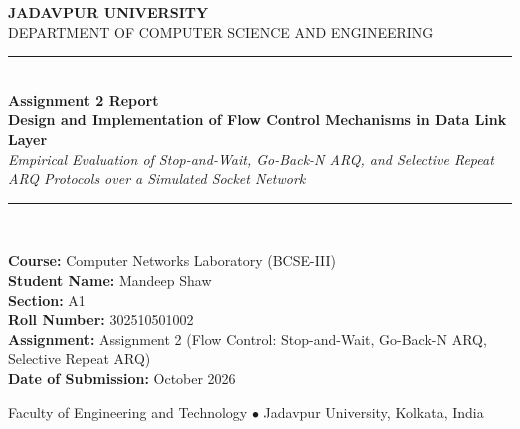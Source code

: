 \documentclass[11pt,a4paper]{article}
\begin{document}
\hypersetup{pageanchor=false}
\begin{titlepage}
    \centering
    \vspace*{1.5cm}
    
    {\Large \textbf{JADAVPUR UNIVERSITY}}\\[0.3cm]
    {\large DEPARTMENT OF COMPUTER SCIENCE AND ENGINEERING}\\[2.0cm]
    
    \rule{\linewidth}{1.2pt}\\[0.4cm]
    {\huge \textbf{Assignment 2 Report}}\\[0.3cm]
    {\LARGE \textbf{Design and Implementation of Flow Control Mechanisms in Data Link Layer}}\\[0.3cm]
    {\large \textit{Empirical Evaluation of Stop-and-Wait, Go-Back-N ARQ, and Selective Repeat ARQ Protocols over a Simulated Socket Network}}\\[0.4cm]
    \rule{\linewidth}{1.2pt}\\[2.2cm]
    
    \begin{flushleft}
        \large
        \textbf{Course:} Computer Networks Laboratory (BCSE-III)\\[0.2cm]
        \textbf{Student Name:} Mandeep Shaw\\[0.2cm]
        \textbf{Section:} A1\\[0.2cm]
        \textbf{Roll Number:} 302510501002\\[0.2cm]
        \textbf{Assignment:} Assignment 2 (Flow Control: Stop-and-Wait, Go-Back-N ARQ, Selective Repeat ARQ)\\[0.2cm]
        \textbf{Date of Submission:} October 2026
    \end{flushleft}
    
    \vfill
    {\small Faculty of Engineering and Technology $\bullet$ Jadavpur University, Kolkata, India}
\end{titlepage}
\hypersetup{pageanchor=true}

\tableofcontents
\newpage

\end{document}
